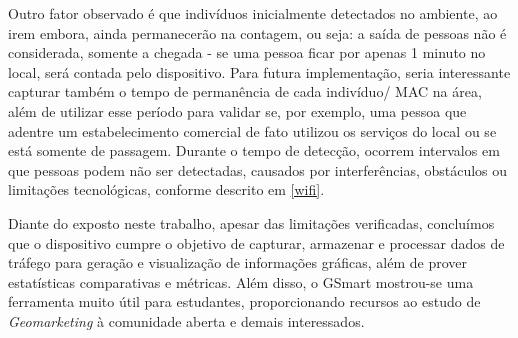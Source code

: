 Outro fator observado é que indivíduos inicialmente detectados no ambiente, ao irem embora, ainda permanecerão na contagem, ou seja: a saída de pessoas não é considerada, somente a chegada - se uma pessoa ficar por apenas 1 minuto no local, será contada pelo dispositivo. Para futura implementação, seria interessante capturar também o tempo de permanência de cada indivíduo/ MAC na área, além de utilizar esse período para validar se, por exemplo, uma pessoa que adentre um estabelecimento comercial de fato utilizou os serviços do local ou se está somente de passagem. Durante o tempo de detecção, ocorrem intervalos em que pessoas podem não ser detectadas, causados por interferências, obstáculos ou limitações tecnológicas, conforme descrito em \autoref{wifi}.

Diante do exposto neste trabalho, apesar das limitações verificadas, concluímos que o dispositivo cumpre o objetivo de capturar, armazenar e processar dados de tráfego para geração e visualização de informações gráficas, além de prover estatísticas comparativas e métricas. Além disso, o GSmart mostrou-se uma ferramenta muito útil para estudantes, proporcionando recursos ao estudo de \emph{Geomarketing} à comunidade aberta e demais interessados. 





